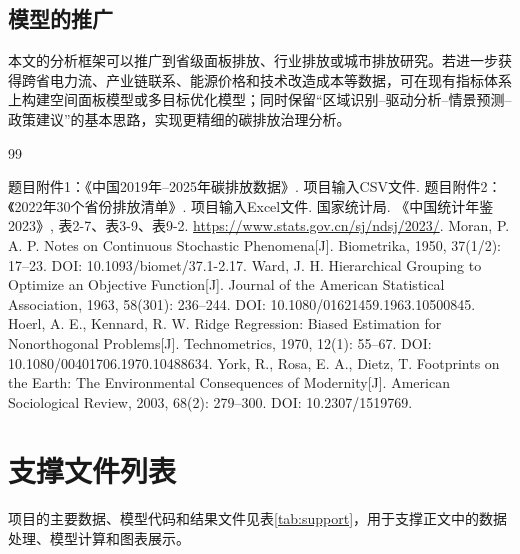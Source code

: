 \documentclass[12pt,a4paper]{ctexart}
\renewcommand{\thesection}{\chinese{section}、}
\renewcommand{\thesubsection}{\arabic{section}.\arabic{subsection}}
\renewcommand{\thesubsubsection}{\arabic{section}.\arabic{subsection}.\arabic{subsubsection}}
\theoremstyle{definition}
\theoremstyle{plain}
\theoremstyle{remark}
\begin{document}
\subsection{模型的推广}
本文的分析框架可以推广到省级面板排放、行业排放或城市排放研究。若进一步获得跨省电力流、产业链联系、能源价格和技术改造成本等数据，可在现有指标体系上构建空间面板模型或多目标优化模型；同时保留“区域识别--驱动分析--情景预测--政策建议”的基本思路，实现更精细的碳排放治理分析。
\newpage
\begin{thebibliography}{99}
\raggedright
{}
 题目附件1：《中国2019年--2025年碳排放数据》. 项目输入CSV文件.
 题目附件2：《2022年30个省份排放清单》. 项目输入Excel文件.
 国家统计局. 《中国统计年鉴2023》, 表2-7、表3-9、表9-2. \url{https://www.stats.gov.cn/sj/ndsj/2023/}.
 Moran, P. A. P. Notes on Continuous Stochastic Phenomena[J]. Biometrika, 1950, 37(1/2): 17--23. DOI: 10.1093/biomet/37.1-2.17.
 Ward, J. H. Hierarchical Grouping to Optimize an Objective Function[J]. Journal of the American Statistical Association, 1963, 58(301): 236--244. DOI: 10.1080/01621459.1963.10500845.
 Hoerl, A. E., Kennard, R. W. Ridge Regression: Biased Estimation for Nonorthogonal Problems[J]. Technometrics, 1970, 12(1): 55--67. DOI: 10.1080/00401706.1970.10488634.
 York, R., Rosa, E. A., Dietz, T. Footprints on the Earth: The Environmental Consequences of Modernity[J]. American Sociological Review, 2003, 68(2): 279--300. DOI: 10.2307/1519769.

\end{thebibliography}

\newpage
\appendix
\renewcommand{\thesection}{附录 \Alph{section}}
\renewcommand{\thesubsection}{\Alph{section}.\arabic{subsection}}
\renewcommand{\thesubsubsection}{\Alph{section}.\arabic{subsection}.\arabic{subsubsection}}
\titleformat{\section}{\centering\heiti\zihao{-3}\bfseries}{\thesection}{1em}{}

\section{支撑文件列表}
项目的主要数据、模型代码和结果文件见表\ref{tab:support}，用于支撑正文中的数据处理、模型计算和图表展示。
\end{document}
